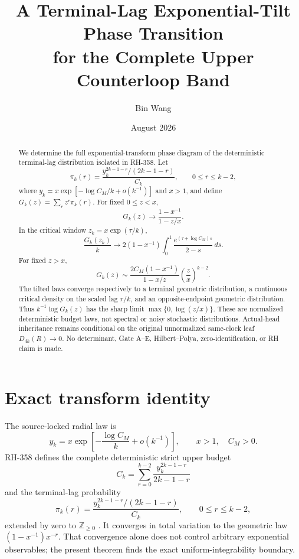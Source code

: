\documentclass[11pt]{article}
\title{A Terminal-Lag Exponential-Tilt Phase Transition\\
for the Complete Upper Counterloop Band}
\author{Bin Wang}
\date{August 2026}
\theoremstyle{remark}
\begin{document}
\maketitle

\begin{abstract}
We determine the full exponential-transform phase diagram of the deterministic
terminal-lag distribution isolated in RH-358.  Let
\[
 \pi_k(r)=\frac{y_k^{2k-1-r}/(2k-1-r)}{C_k},
 \qquad 0\le r\le k-2,
\]
where $y_k=x\exp[-\log C_M/k+o(k^{-1})]$ and $x>1$, and define
$G_k(z)=\sum_rz^r\pi_k(r)$.  For fixed $0\le z<x$,
\[
 G_k(z)\longrightarrow\frac{1-x^{-1}}{1-z/x}.
\]
In the critical window $z_k=x\exp(\tau/k)$,
\[
 \frac{G_k(z_k)}k\longrightarrow
 2(1-x^{-1})\int_0^1\frac{e^{(\tau+\log C_M)s}}{2-s}\,ds.
\]
For fixed $z>x$,
\[
 G_k(z)\sim
 \frac{2C_M(1-x^{-1})}{1-x/z}\left(\frac zx\right)^{k-2}.
\]
The tilted laws converge respectively to a terminal geometric distribution, a
continuous critical density on the scaled lag $r/k$, and an opposite-endpoint
geometric distribution.  Thus $k^{-1}\log G_k(z)$ has the sharp limit
$\max\{0,\log(z/x)\}$.  These are normalized deterministic budget laws, not
spectral or noisy stochastic distributions.  Actual-head inheritance remains
conditional on the original unnormalized same-clock leaf $D_{4k}(R)\to0$.
No determinant, Gate A--E, Hilbert--Polya, zero-identification, or RH claim is
made.
\end{abstract}

\section{Exact transform identity}

The source-locked radial law is
\begin{equation}\label{eq:y}
 y_k=x\exp\left[-\frac{\log C_M}{k}+o(k^{-1})\right],
 \qquad x>1,\quad C_M>0.
\end{equation}
RH-358 defines the complete deterministic strict upper budget
\begin{equation}\label{eq:C}
 C_k=\sum_{r=0}^{k-2}\frac{y_k^{2k-1-r}}{2k-1-r}
\end{equation}
and the terminal-lag probability
\begin{equation}\label{eq:pi}
 \pi_k(r)=\frac{y_k^{2k-1-r}/(2k-1-r)}{C_k},
 \qquad 0\le r\le k-2,
\end{equation}
extended by zero to $\mathbb Z_{\ge0}$
\citep{WangTerminalLag2026}.  It converges in total variation to the
geometric law $(1-x^{-1})x^{-r}$.  That convergence alone does not control
arbitrary exponential observables; the present theorem finds the exact
uniform-integrability boundary.
\end{document}
